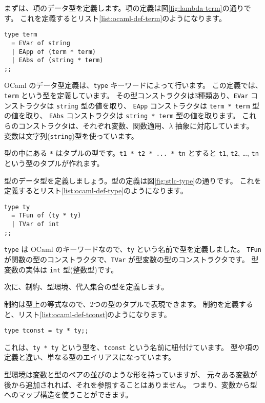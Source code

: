 まずは、項のデータ型を定義します。項の定義は図\ref{fig:lambda-term}の通りです。
これを定義するとリスト\ref{list:ocaml-def-term}のようになります。

\begin{lstlisting}[caption=項の定義, label=list:ocaml-def-term]
type term
  = EVar of string
  | EApp of (term * term)
  | EAbs of (string * term)
;;
\end{lstlisting}

OCaml のデータ型定義は、\texttt{type} キーワードによって行います。
この定義では、\texttt{term} という型を定義しています。
その型コンストラクタは3種類あり、\texttt{EVar} コンストラクタは \texttt{string} 型の値を取り、
\texttt{EApp} コンストラクタは \texttt{term * term} 型の値を取り、
\texttt{EAbs} コンストラクタは \texttt{string * term} 型の値を取ります。
これらのコンストラクタは、それぞれ変数、関数適用、$\lambda$ 抽象に対応しています。
変数は文字列(\texttt{string})型を使っています。

型の中にある \texttt{*} はタプルの型です。\texttt{t1 * t2 * ... * tn} とすると
\texttt{t1}, \texttt{t2}, \dots, \texttt{tn} という型のタプルが作れます。

型のデータ型を定義しましょう。型の定義は図\ref{fig:stlc-type}の通りです。
これを定義するとリスト\ref{list:ocaml-def-type}のようになります。

\begin{lstlisting}[caption=型の定義, label=list:ocaml-def-type]
type ty
  = TFun of (ty * ty)
  | TVar of int
;;
\end{lstlisting}

\texttt{type} は OCaml のキーワードなので、\texttt{ty} という名前で型を定義しました。
\texttt{TFun} が関数の型のコンストラクタで、\texttt{TVar} が型変数の型のコンストラクタです。
型変数の実体は \texttt{int} 型(整数型)です。

次に、制約、型環境、代入集合の型を定義します。

制約は型上の等式なので、2つの型のタプルで表現できます。
制約を定義すると、リスト\ref{list:ocaml-def-tconst}のようになります。

\begin{lstlisting}[caption=制約の定義, label=list:ocaml-def-tconst]
type tconst = ty * ty;;
\end{lstlisting}

これは、\texttt{ty * ty} という型を、\texttt{tconst} という名前に紐付けています。
型や項の定義と違い、単なる型のエイリアスになっています。

型環境は変数と型のペアの並びのような形を持っていますが、
元々ある変数が後から追加されれば、それを参照することはありません。
つまり、変数から型へのマップ構造を使うことができます。

